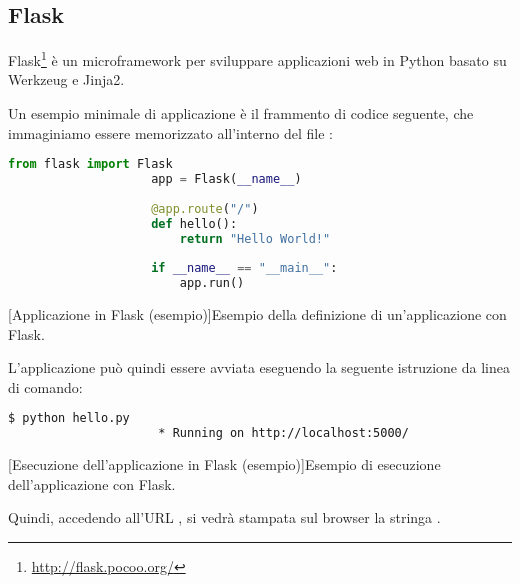         \subsection{Flask} \label{subsec:p;sl;flask}
        
            Flask\footnote{\url{http://flask.pocoo.org/}} è un microframework per sviluppare applicazioni web in Python basato su Werkzeug e Jinja2.
            
            Un esempio minimale di applicazione è il frammento di codice seguente, che immaginiamo essere memorizzato all'interno del file :
            
            \begin{center}
                \begin{lstlisting}[language=python, gobble=18]
                    from flask import Flask
                    app = Flask(__name__)
                    
                    @app.route("/")
                    def hello():
                        return "Hello World!"
                    
                    if __name__ == "__main__":
                        app.run()
                \end{lstlisting}
                \captionsetup{textformat=empty,labelformat=empty} \vspace{-2em}
                [Applicazione in Flask (esempio)]{Esempio della definizione di un'applicazione con Flask.}
            \end{center}
            
            L'applicazione può quindi essere avviata eseguendo la seguente istruzione da linea di comando:
            
            \begin{center}
                \begin{lstlisting}[language=bash, gobble=18]
                    $ python hello.py
                     * Running on http://localhost:5000/
                \end{lstlisting}
                \captionsetup{textformat=empty,labelformat=empty} \vspace{-2em}
                [Esecuzione dell'applicazione in Flask (esempio)]{Esempio di esecuzione dell'applicazione con Flask.}
            \end{center}
            
            Quindi, accedendo all'\ac{URL} , si vedrà stampata sul browser la stringa .
            
